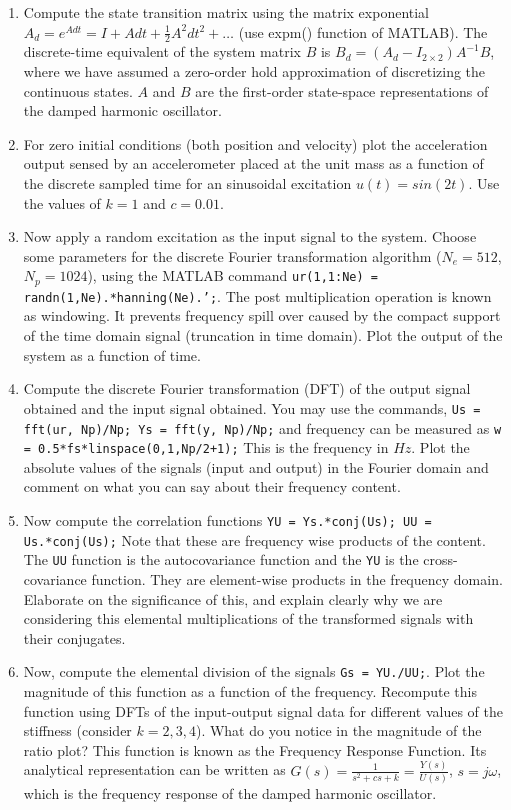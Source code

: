 \documentclass{article}
\begin{document}
\begin{enumerate}
    \item Compute the state transition matrix using the matrix exponential $A_d=e^{Adt}=I+Adt+\frac{1}{2}A^2dt^2+\dots$ (use expm() function of MATLAB). The discrete-time equivalent of the system matrix $B$ is $B_d=(A_d-I_{2\times2})A^{-1}B$, where we have assumed a zero-order hold approximation of discretizing the continuous states. $A$ and $B$ are the first-order state-space representations of the damped harmonic oscillator.
    
    \item For zero initial conditions (both position and velocity) plot the acceleration output sensed by an accelerometer placed at the unit mass as a function of the discrete sampled time for an sinusoidal excitation $u(t)=sin(2t)$. Use the values of $k=1$ and $c=0.01$.
    
    \item Now apply a random excitation as the input signal to the system. Choose some parameters for the discrete Fourier transformation algorithm ($N_e=512$, $N_p=1024$), using the MATLAB command \texttt{ur(1,1:Ne) =\\randn(1,Ne).*hanning(Ne).';}. The post multiplication operation is known as windowing. It prevents frequency spill over caused by the compact support of the time domain signal (truncation in time domain). Plot the output of the system as a function of time.
    
    \item Compute the discrete Fourier transformation (DFT) of the output signal obtained and the input signal obtained. You may use the commands, \texttt{Us = fft(ur, Np)/Np; Ys = fft(y, Np)/Np;} and frequency can be measured as \texttt{w = 0.5*fs*linspace(0,1,Np/2+1);} This is the frequency in $Hz$. Plot the absolute values of the signals (input and output) in the Fourier domain and comment on what you can say about their frequency content.

    \item Now compute the correlation functions \texttt{YU = Ys.*conj(Us); UU = \\Us.*conj(Us);} Note that these are frequency wise products of the content. The \texttt{UU} function is the autocovariance function and the \texttt{YU} is the cross-covariance function. They are element-wise products in the frequency domain. Elaborate on the significance of this, and explain clearly why we are considering this elemental multiplications of the transformed signals with their conjugates.

    \item Now, compute the elemental division of the signals \texttt{Gs = YU./UU;}. Plot the magnitude of this function as a function of the frequency. Recompute this function using DFTs of the input-output signal data for different values of the stiffness (consider $k=2,3,4$). What do you notice in the magnitude of the ratio plot? This function is known as the Frequency Response Function. Its analytical representation can be written as $G(s)=\frac{1}{s^2+cs+k}=\frac{Y(s)}{U(s)}$, $s=j\omega$, which is the frequency response of the damped harmonic oscillator.
\end{enumerate}
\end{document}
